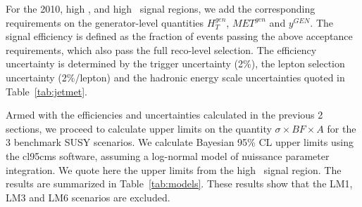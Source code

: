 For the 2010, high \met, and high \Ht\ signal regions, we add the corresponding
requirements on the generator-level quantities $H_{T}^{gen}$, $MET^{gen}$ and $y^{GEN}$.
The signal efficiency is defined as the fraction of events passing the above acceptance requirements, which
also pass the full reco-level selection. The efficiency uncertainty is determined by the trigger uncertainty (2\%),
the lepton selection uncertainty (2\%/lepton) and the hadronic energy scale uncertainties quoted in Table~\ref{tab:jetmet}.




Armed with the efficiencies and uncertainties calculated in the previous 2 sections, we proceed
to calculate upper limits on the quantity $\sigma \times BF \times A$ for the 3 benchmark SUSY 
scenarios. We calculate Bayesian 95\% CL upper
limits using the cl95cms software, assuming a log-normal model of nuissance parameter integration.
We quote here the upper limits from the high \Ht\ signal region.
The results are summarized in
Table~\ref{tab:models}. These results show that the LM1, LM3 and LM6 scenarios are excluded.

